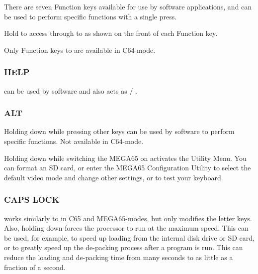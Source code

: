 There are seven Function keys available for use by software applications,       and  can be used to perform specific functions with a single press.

Hold  to access  through to  as shown on the front of each Function key.

Only Function keys  to  are available in C64-mode.

\subsubsection{HELP}

 can be used by software and also acts as  / .

\subsubsection{ALT}

Holding  down while pressing other keys can be used by software to perform specific functions. Not available in C64-mode.

Holding  down while switching the MEGA65 on activates the Utility Menu. You can format an SD card, or enter the MEGA65 Configuration Utility to select the default video mode and change other settings, or to test your keyboard.

\subsubsection{CAPS LOCK}

 works similarly to  in C65 and MEGA65-modes, but only modifies the letter keys.
Also, holding  down forces the processor to run at the maximum speed. This can be used, for example,
to speed up loading from the internal disk drive or SD card, or to greatly speed up the de-packing process after a program is run.
This can reduce the loading and de-packing time from many seconds to as little as a fraction of a second.
